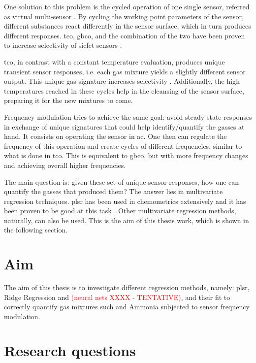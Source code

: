 {One solution to this problem is the cycled operation of one single sensor, referred as virtual multi-sensor \cite{Bastuck_2019}. By cycling the working point parameters of the sensor, different substances react differently in the sensor surface, which in turn produces different responses. \acrfull{tco}, \acrfull{gbco}, and the combination of the two have been proven to increase selectivity of \acrshort{sicfet} sensors \cite{Bastuck_2019}.

\acrshort{tco}, in contrast with a constant temperature evaluation, produces unique transient sensor responses, i.e. each gas mixture yields a slightly different sensor output. This unique gas signature increases selectivity \cite{bur2014}. Additionally, the high temperatures reached in these cycles help in the cleansing of the sensor surface, preparing it for the new mixtures to come.

Frequency modulation tries to achieve the same goal: avoid steady state responses in exchange of unique signatures that could help identify/quantify the gasses at hand. It consists on operating the sensor in \acrfull{ac}. One then can regulate the frequency of this operation and create cycles of different frequencies, similar to what is done in \acrshort{tco}. This is equivalent to \acrshort{gbco}, but with more frequency changes and achieving overall higher frequencies.

The main question is: given these set of unique sensor responses, how one can quantify the gasses that produced them? The answer lies in multivariate regression techniques. \acrfull{plsr} has been used in chemometrics extensively and it has been proven to be good at this task \cite{Bastuck_2019} \cite{wold2011}. Other multivariate regression methods, naturally, can also be used. This is the aim of this thesis work, which is shown in the following section.

\pagebreak
\section{Aim}
\label{sec:aim}

The aim of this thesis is to investigate different regression methods, namely: \acrshort{plsr}, Ridge Regression and \textcolor{red}{(neural nets XXXX - TENTATIVE)}, and their fit to correctly quantify gas mixtures such \nox and Ammonia subjected to sensor frequency modulation.

\section{Research questions}
\label{sec:research-questions}

}
